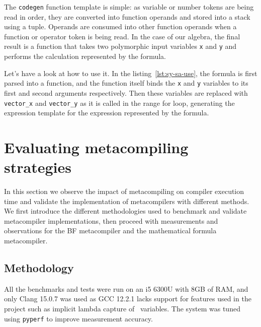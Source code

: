 \documentclass[../../main.tex]{subfiles}
\begin{document}
The \lstinline|codegen| function template is simple: as variable or number tokens
are being read in order, they are converted into function operands and stored
into a stack using a tuple. Operands are consumed into other function operands
when a function or operator token is being read. In the case of our algebra,
the final result is a function that takes two polymorphic input variables
\lstinline|x| and \lstinline|y| and performs the calculation represented by the
formula.



Let's have a look at how to use it.
In the listing~\ref{lst:sy-sa-use}, the formula is first parsed into a function,
and the function itself binds the \lstinline|x| and \lstinline|y| variables to
its first and second arguments respectively. Then these variables are replaced
with \lstinline|vector_x| and \lstinline|vector_y| as it is called in the range
for loop, generating the expression template for the expression represented by
the formula.



\section{Evaluating metacompiling strategies}

In this section we observe the impact of metacompiling on compiler execution
time and validate the implementation of metacompilers with different methods.
We first introduce the different methodologies used to benchmark and validate
metacompiler implementations, then proceed with measurements and observations
for the BF metacompiler and the mathematical formula metacompiler.

\subsection{Methodology}

All the benchmarks and tests were run on an i5 6300U with 8GB of RAM, and only
Clang 15.0.7 was used as GCC 12.2.1 lacks support for features used in the
project such as implicit lambda capture of \constexpr~variables. The system was
tuned using \lstinline|pyperf| to improve measurement accuracy.\\
\end{document}
